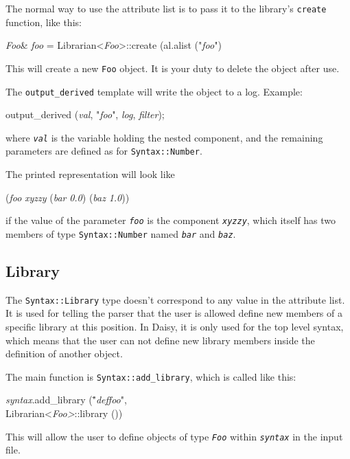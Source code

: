 \documentclass{article}
\newcommand{\code}[1]{\texttt{#1}}
\begin{document}
The normal way to use the attribute list is to pass it to the
library's \code{create} function, like this:
\begin{center}
  \begin{tt}
    \textit{Foo}\& \textit{foo}
      = Librarian<\textit{Foo}>::create (al.alist ("\textit{foo}")
  \end{tt}
\end{center}
This will create a new \code{Foo} object.  It is your duty to delete
the object after use.

The \code{output\_derived} template will write the object to a log.
Example: 
\begin{center}
  \begin{tt}
    output\_derived (\textit{val}, "\textit{foo}", 
                     \textit{log}, \textit{filter});
  \end{tt}
\end{center}
where \texttt{\textit{val}} is the variable holding the nested
component, and the remaining parameters are defined as for
\texttt{Syntax::Number}. 

The printed representation will look like
\begin{center}
  \begin{tt}
    (\textit{foo} \textit{xyzzy} 
      (\textit{bar} \textit{0.0}) (\textit{baz} \textit{1.0}))
  \end{tt}
\end{center}
if the value of the parameter \texttt{\textit{foo}} is the component
\texttt{\textit{xyzzy}}, which itself has two members of type
\code{Syntax::Number} named \texttt{\textit{bar}} and
\texttt{\textit{baz}}.

\subsection{Library}

The \code{Syntax::Library} type doesn't correspond to any value in the
attribute list.  It is used for telling the parser that the user is
allowed define new members of a specific library at this position.  In
Daisy, it is only used for the top level syntax, which means that the
user can not define new library members inside the definition of
another object.

The main function is \code{Syntax::add\_library}, which is called like
this:
\begin{center}
  \begin{tt}
    \begin{tabbing}
      \textit{syntax}.add\_library (\="\textit{deffoo}",\\
                                   \>Librarian<\textit{Foo>}::library ())
    \end{tabbing}
  \end{tt}
\end{center}
This will allow the user to define objects of type
\texttt{\textit{Foo}} within \texttt{\textit{syntax}} in the input
file.  
\end{document}
